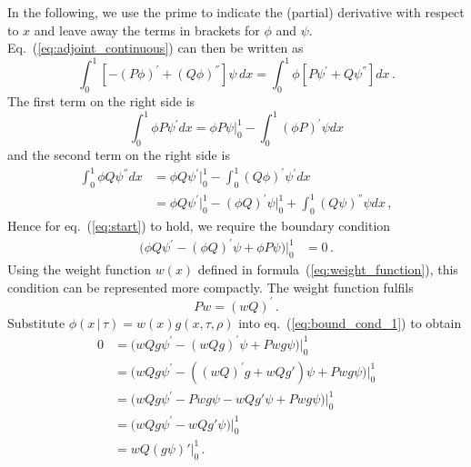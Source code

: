 \documentclass[preprint]{elsarticle}
\newcommand\given{{\,|\,}}
\begin{document}
In the following, we use the prime to indicate the (partial) derivative with respect to $x$ and leave away the terms in brackets for $\phi$ and $\psi$. Eq.~(\ref{eq:adjoint_continuous}) can then be written as
\begin{equation}\label{eq:start}
\int_0^1  \left[-(P\phi)^{'}+(Q\phi)^{''}\right] \psi\, dx=
\int_0^1  \phi \left[P\psi^{'}+Q\psi^{''}\right] dx\,.
\end{equation}
The first term on the right side is 
\begin{equation}
\int_0^1  \phi P\psi^{'} dx= \phi P\psi\big|_0^1 -\int_0^1  (\phi P)^{'}\psi dx
\end{equation}
and the second term on the right side is
\begin{equation}
\begin{split}
\int_0^1  \phi Q\psi^{''} dx&=
\phi Q\psi^{'}\big|_0^1-\int_0^1  (Q\phi)^{'}\psi^{'} dx\\
&=\phi Q\psi^{'}\big|_0^1-(\phi Q)^{'}\psi\big|_0^1+\int_0^1  (Q\psi)^{''}\psi dx\,,
\end{split}
\end{equation}
Hence for eq.~(\ref{eq:start}) to hold, we require the boundary condition 
\begin{equation}\label{eq:bound_cond_1}
\begin{split}
\big(\phi Q\psi^{'}-(\phi Q)^{'}\psi+\phi P\psi\big)\big|_0^1&=0\,.
\end{split}
\end{equation}
Using the weight function $w(x)$ defined in formula~(\ref{eq:weight_function}), this condition can be represented more compactly. The weight function fulfils
\begin{equation}
Pw=(wQ)^{'}\,.
\end{equation}
Substitute $\phi(x\given \tau)=w(x)g(x,\tau,\rho)$ into eq.~(\ref{eq:bound_cond_1}) to obtain
\begin{equation}\label{eq:bound_cond_2}
\begin{split}
0&=\big(w Q g\psi^{'}-(w Q g)^{'}\psi+P w g\psi\big)\big|_0^1\\
&=\big(w Q g\psi^{'}-((w Q)^{'}g+w Q g')\psi+P w g\psi\big)\big|_0^1\\
&=\big(w Q g\psi^{'}-Pwg\psi-w Q g'\psi+P w g\psi\big)\big|_0^1\\
&=\big(w Q g\psi^{'}-w Qg'\psi\big)\big|_0^1\\
&=w Q(g\psi)'\big|_0^1\,.
\end{split}
\end{equation}
\end{document}
